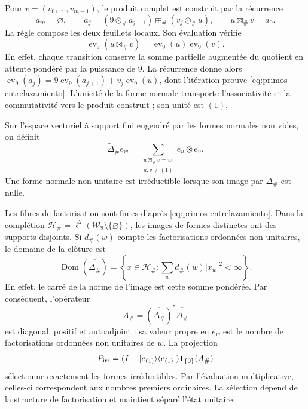 Pour \(v=(v_0,\ldots,v_{m-1})\), le produit complet est construit par
la récurrence
\[
 a_m=\varnothing,\qquad
 a_j=(9\odot_\#a_{j+1})\boxplus_\#(v_j\odot_\#u),
 \qquad u\boxtimes_\#v=a_0.
\]
La règle compose les deux feuillets locaux. Son évaluation vérifie
\begin{equation}
 \operatorname{ev}_9(u\boxtimes_\#v)
   =\operatorname{ev}_9(u)\operatorname{ev}_9(v).
 \label{eq:primos-entrelazamiento}
\end{equation}
En effet, chaque transition conserve la somme partielle augmentée du quotient
en attente pondéré par la puissance de \(9\). La récurrence donne alors
\(\operatorname{ev}_9(a_j)=9\operatorname{ev}_9(a_{j+1})+
v_j\operatorname{ev}_9(u)\), dont l'itération prouve
\eqref{eq:primos-entrelazamiento}. L'unicité de la forme normale transporte
l'associativité et la commutativité vers le produit construit ; son unité est \((1)\).

\begin{definition}
Sur l'espace vectoriel à support fini engendré par les formes normales non vides, on définit
\[
 \widetilde\Delta_\# e_w
 =\sum_{\substack{u\boxtimes_\#v=w\\u,v\ne(1)}}e_u\otimes e_v.
\]
Une forme normale non unitaire est irréductible lorsque son image par
\(\widetilde\Delta_\#\) est nulle.
\end{definition}

Les fibres de factorisation sont finies d'après
\eqref{eq:primos-entrelazamiento}. Dans la complétion
\(\mathcal H_\#=\ell^2(\mathcal W_9\setminus\{\varnothing\})\),
les images de formes distinctes ont des supports disjoints. Si
\(d_\#(w)\) compte les factorisations ordonnées non unitaires, le domaine
de la clôture est
\[
 \operatorname{Dom}(\overline{\widetilde\Delta_\#})
 =\left\{x\in\mathcal H_\#:
       \sum_w d_\#(w)|x_w|^2<\infty\right\}.
\]
En effet, le carré de la norme de l'image est cette somme pondérée. Par conséquent, l'opérateur
\[
 A_\#=(\overline{\widetilde\Delta_\#})^*
                  \overline{\widetilde\Delta_\#}
\]
est diagonal, positif et autoadjoint : sa valeur propre en \(e_w\) est le
nombre de factorisations ordonnées non unitaires de \(w\). La projection
\[
 P_{\rm irr}=(I-|e_{(1)}\rangle\langle e_{(1)}|)
                    \mathbf1_{\{0\}}(A_\#)
\]
sélectionne exactement les formes irréductibles. Par l'évaluation multiplicative, celles-ci correspondent aux nombres premiers ordinaires. La sélection dépend de la structure de factorisation et maintient séparé l'état unitaire.

